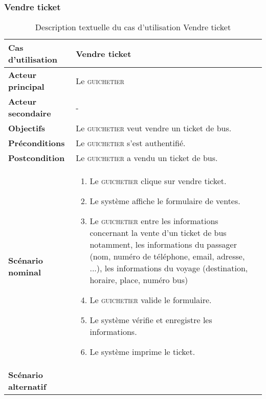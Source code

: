        \subsubsection[Vendre ticket]{Vendre ticket}
        \begin{longtable}{p{4cm} p{9cm}}
            \caption{Description textuelle du cas d’utilisation Vendre ticket}
            \label{table:usecaseVendreBill}
            \\\hline\hline
                \textbf{Cas d’utilisation} & \textbf{Vendre ticket}
            \\\hline\hline
                    \textbf{Acteur principal} & Le \textsc{guichetier}
                \\
                    \textbf{Acteur secondaire} & -
                \\
                    \textbf{Objectifs} & Le \textsc{guichetier} veut vendre un ticket de bus.
                \\
                    \textbf{Préconditions} & Le \textsc{guichetier} s’est authentifié.
                \\
                    \textbf{Postcondition} & Le \textsc{guichetier} a vendu un ticket de bus.
                \\
                \textbf{Scénario nominal} &
                    \begin{enumerate}[leftmargin=*]
                        \item Le \textsc{guichetier} clique sur vendre ticket.
                        \item Le système affiche le formulaire de ventes.
                        \item Le \textsc{guichetier} entre les informations concernant
                        la vente d’un ticket de bus notamment, les informations du passager (nom,
                        numéro de téléphone, email, adresse, ...), les informations du voyage
                        (destination, horaire, place, numéro bus)
                        \item Le \textsc{guichetier} valide le formulaire.
                        \item Le système vérifie et enregistre les informations.
                        \item Le système imprime le ticket.
                    \end{enumerate}
                \\
                \textbf{Scénario alternatif} &
                    \begin{enumerate}[leftmargin=*]

\end{enumerate}
\end{longtable}
